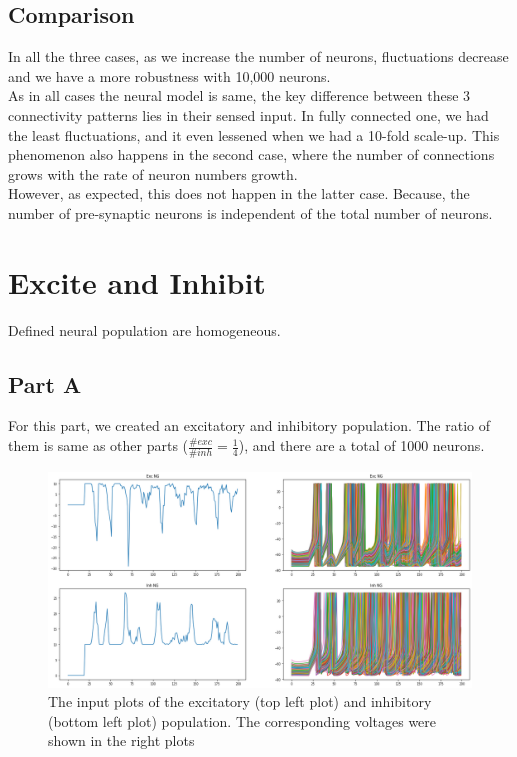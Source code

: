 \documentclass{article}
\begin{document}
	\subsection{Comparison}
	In all the three cases, as we increase the number of neurons, fluctuations decrease and we have a more robustness with 10,000 neurons.\\
	As in all cases the neural model is same, the key difference between these 3 connectivity patterns lies in their sensed input. In fully connected one, we had the least fluctuations, and it even lessened when we had a 10-fold scale-up. This phenomenon also happens in the second case, where the number of connections grows with the rate of neuron numbers growth.\\ However, as expected, this does not happen in the latter case. Because, the number of pre-synaptic neurons is independent of the total number of neurons.
	
	\section{Excite and Inhibit}
	Defined neural population are homogeneous. 
	\subsection{Part A}
	For this part, we created an excitatory and inhibitory population. The ratio of them is same as other parts ($\frac{\#exc}{\#inh} = \frac{1}{4}$), and there are a total of 1000 neurons. 
	
	\begin{figure}[h]
		\includegraphics[width=1.2\textwidth]{input2.png}
		\caption{The input plots of the excitatory (top left plot) and inhibitory (bottom left plot) population. The corresponding voltages were shown in the right plots}
		\label{ei_inp}
	\end{figure}
	
\end{document}
